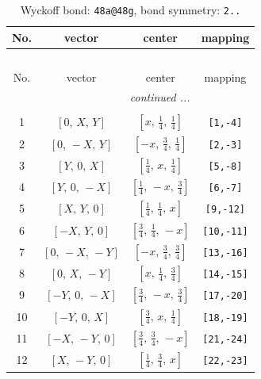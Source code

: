 \documentclass[fleqn,8pt]{jsarticle}
\begin{document}
\begin{longtable}{cccc}
\caption{Wyckoff bond: {\tt 48a@48g}, bond symmetry: {\tt 2..}}
 \\
 \hline \hline
No. & vector & center & mapping \\ \hline \endfirsthead

\multicolumn{3}{l}{\tablename\ \thetable{}} \\
 \hline \hline
No. & vector & center & mapping \\ \hline \endhead

 \hline \hline
\multicolumn{3}{r}{\footnotesize\it continued ...} \\ \endfoot

 \hline \hline
\multicolumn{3}{r}{} \\ \endlastfoot

1 & $\left[ 0,\, X,\, Y \right]$ & $\left[ x,\, \frac{1}{4},\, \frac{1}{4} \right]$ & {\tt [1,-4]} \\ \hline
2 & $\left[ 0,\, - X,\, Y \right]$ & $\left[ - x,\, \frac{3}{4},\, \frac{1}{4} \right]$ & {\tt [2,-3]} \\ \hline
3 & $\left[ Y,\, 0,\, X \right]$ & $\left[ \frac{1}{4},\, x,\, \frac{1}{4} \right]$ & {\tt [5,-8]} \\ \hline
4 & $\left[ Y,\, 0,\, - X \right]$ & $\left[ \frac{1}{4},\, - x,\, \frac{3}{4} \right]$ & {\tt [6,-7]} \\ \hline
5 & $\left[ X,\, Y,\, 0 \right]$ & $\left[ \frac{1}{4},\, \frac{1}{4},\, x \right]$ & {\tt [9,-12]} \\ \hline
6 & $\left[ - X,\, Y,\, 0 \right]$ & $\left[ \frac{3}{4},\, \frac{1}{4},\, - x \right]$ & {\tt [10,-11]} \\ \hline
7 & $\left[ 0,\, - X,\, - Y \right]$ & $\left[ - x,\, \frac{3}{4},\, \frac{3}{4} \right]$ & {\tt [13,-16]} \\ \hline
8 & $\left[ 0,\, X,\, - Y \right]$ & $\left[ x,\, \frac{1}{4},\, \frac{3}{4} \right]$ & {\tt [14,-15]} \\ \hline
9 & $\left[ - Y,\, 0,\, - X \right]$ & $\left[ \frac{3}{4},\, - x,\, \frac{3}{4} \right]$ & {\tt [17,-20]} \\ \hline
10 & $\left[ - Y,\, 0,\, X \right]$ & $\left[ \frac{3}{4},\, x,\, \frac{1}{4} \right]$ & {\tt [18,-19]} \\ \hline
11 & $\left[ - X,\, - Y,\, 0 \right]$ & $\left[ \frac{3}{4},\, \frac{3}{4},\, - x \right]$ & {\tt [21,-24]} \\ \hline
12 & $\left[ X,\, - Y,\, 0 \right]$ & $\left[ \frac{1}{4},\, \frac{3}{4},\, x \right]$ & {\tt [22,-23]} \\
\end{longtable}
\end{document}
